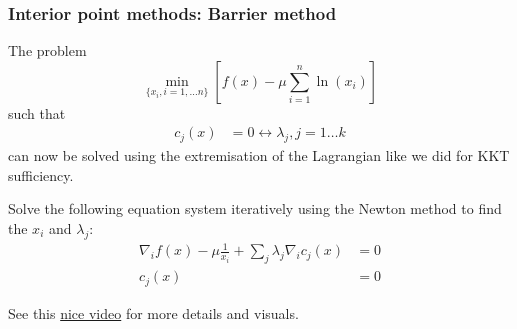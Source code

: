 \documentclass[10pt,aspectratio=169,dvipsnames]{beamer}
\def\l{\lambda}
\def\m{\mu}
\begin{document}
\begin{frame}
  \frametitle{Interior point methods: Barrier method}

  The problem
\begin{equation*}
  \min_{\{x_i, i=1,\dots n\}} \left[ f(x) - \m \sum_{i=1}^n \ln(x_i)  \right]
\end{equation*}
such that
\begin{align*}
  c_j(x) & = 0 \leftrightarrow \l_j, j = 1\dots k
\end{align*}
can now be solved using the extremisation of the Lagrangian like we did for KKT sufficiency.

Solve the following equation system iteratively using the Newton method to find the $x_i$ and $\lambda_j$:
\begin{align*}
    \nabla_i f(x) - \m  \frac{1}{x_i} + \sum_j \lambda_j \nabla_i c_j(x) & = 0 \\
  c_j(x) & = 0
\end{align*}

See this \href{https://www.youtube.com/watch?v=zm4mfr-QT1E}{nice video} for more details and visuals.
\end{frame}
\end{document}
